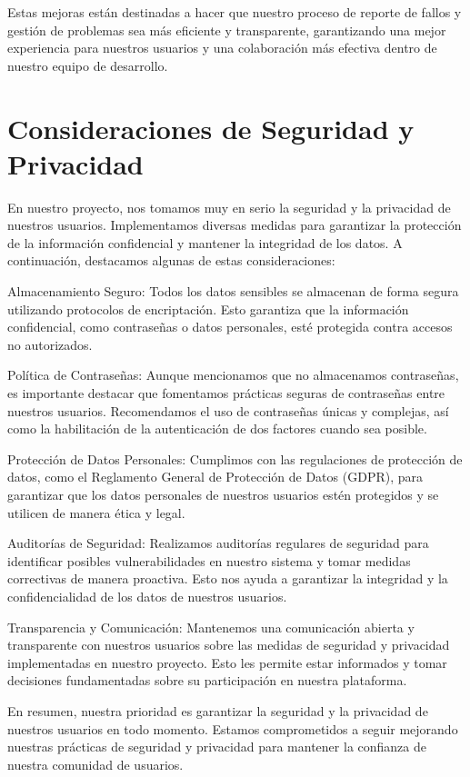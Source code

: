 \documentclass{article}
\begin{document}
Estas mejoras están destinadas a hacer que nuestro proceso de reporte de fallos y gestión de problemas sea más eficiente y transparente, garantizando una mejor experiencia para nuestros usuarios y una colaboración más efectiva dentro de nuestro equipo de desarrollo.



\section{Consideraciones de Seguridad y Privacidad}

En nuestro proyecto, nos tomamos muy en serio la seguridad y la privacidad de nuestros usuarios. Implementamos diversas medidas para garantizar la protección de la información confidencial y mantener la integridad de los datos. A continuación, destacamos algunas de estas consideraciones:

    Almacenamiento Seguro: Todos los datos sensibles se almacenan de forma segura utilizando protocolos de encriptación. Esto garantiza que la información confidencial, como contraseñas o datos personales, esté protegida contra accesos no autorizados.

    Política de Contraseñas: Aunque mencionamos que no almacenamos contraseñas, es importante destacar que fomentamos prácticas seguras de contraseñas entre nuestros usuarios. Recomendamos el uso de contraseñas únicas y complejas, así como la habilitación de la autenticación de dos factores cuando sea posible.

    Protección de Datos Personales: Cumplimos con las regulaciones de protección de datos, como el Reglamento General de Protección de Datos (GDPR), para garantizar que los datos personales de nuestros usuarios estén protegidos y se utilicen de manera ética y legal.

    Auditorías de Seguridad: Realizamos auditorías regulares de seguridad para identificar posibles vulnerabilidades en nuestro sistema y tomar medidas correctivas de manera proactiva. Esto nos ayuda a garantizar la integridad y la confidencialidad de los datos de nuestros usuarios.

    Transparencia y Comunicación: Mantenemos una comunicación abierta y transparente con nuestros usuarios sobre las medidas de seguridad y privacidad implementadas en nuestro proyecto. Esto les permite estar informados y tomar decisiones fundamentadas sobre su participación en nuestra plataforma.

En resumen, nuestra prioridad es garantizar la seguridad y la privacidad de nuestros usuarios en todo momento. Estamos comprometidos a seguir mejorando nuestras prácticas de seguridad y privacidad para mantener la confianza de nuestra comunidad de usuarios.
\end{document}

